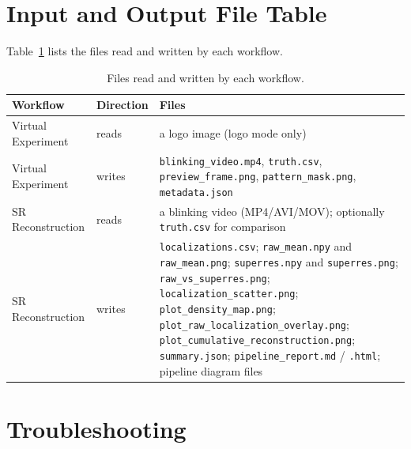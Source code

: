 \documentclass[11pt,a4paper]{article}
\newcommand{\file}[1]{\texttt{#1}}
\begin{document}
\section{Input and Output File Table}
\label{sec:files}
Table~\ref{tab:io} lists the files read and written by each workflow.

\begin{table}[htbp]
\centering\small
\begin{tabularx}{\linewidth}{@{}llX@{}}
\toprule
\textbf{Workflow} & \textbf{Direction} & \textbf{Files}\\
\midrule
Virtual Experiment & reads & a logo image (logo mode only)\\
Virtual Experiment & writes & \file{blinking\_video.mp4}, \file{truth.csv},
  \file{preview\_frame.png}, \file{pattern\_mask.png}, \file{metadata.json}\\
\midrule
SR Reconstruction & reads & a blinking video (MP4/AVI/MOV); optionally
  \file{truth.csv} for comparison\\
SR Reconstruction & writes & \file{localizations.csv};
  \file{raw\_mean.npy} and \file{raw\_mean.png};
  \file{superres.npy} and \file{superres.png};
  \file{raw\_vs\_superres.png}; \file{localization\_scatter.png};
  \file{plot\_density\_map.png}; \file{plot\_raw\_localization\_overlay.png};
  \file{plot\_cumulative\_reconstruction.png}; \file{summary.json};
  \file{pipeline\_report.md} / \file{.html}; pipeline diagram files\\
\bottomrule
\end{tabularx}
\caption{Files read and written by each workflow.}
\label{tab:io}
\end{table}

\section{Troubleshooting}
\label{sec:troubleshoot}
\end{document}
